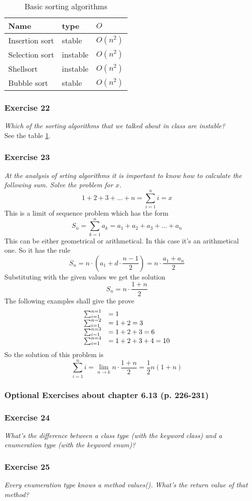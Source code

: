 \begin{table}[h!]
	\centering
	\begin{tabular}{l l l}
		Name		& type		& $O$ \\
		\hline
		Insertion sort	& stable	& $O(n^2)$ \\
		Selection sort	& instable	& $O(n^2)$ \\
		Shellsort	& instable	& $O(n^2)$ \\
		Bubble sort	& stable	& $O(n^2)$ 
	\end{tabular}
	\caption{Basic sorting algorithms}
	\label{table:sorting-algorithms}
\end{table}

\subsubsection*{Exercise 22}
\textit{Which of the sorting algorithms that we talked about in class 
are instable?} \\
See the table \ref{table:sorting-algorithms}.

\subsubsection*{Exercise 23}
\textit{At the analysis of srting algorithms it is important to know how to
calculate the following sum. Solve the problem for $x$.} \\
\[ 1 + 2 + 3 + \dots + n =  \sum_{i=1}^{n} i = x \]
This is a limit of sequence problem which has the form
\[ S_n = \sum_{k=1}^n a_k = a_1 + a_2 + a_3 + \dots + a_n \]
This can be either geometrical or arithmetical. In this case it's an 
arithmetical one. So it has the rule 
\[ S_n = n \cdot \left( a_1 + d \cdot \frac{n-1}{2}\right) = n \cdot \frac{a_1+a_n}{2} \]
Substituting with the given values we get the solution 
\[ S_n = n \cdot \frac{1+n}{2} \]
The following examples shall give the prove
\[ \begin{array}{l l l}
	\sum_{i=1}^{n=1} &= 1 \\
	\sum_{i=1}^{n=2} &= 1 + 2 = 3 \\
	\sum_{i=1}^{n=3} &= 1 + 2 + 3 = 6 \\
	\sum_{i=1}^{n=4} &= 1 + 2 + 3 + 4 = 10 \\
\end{array} \]
So the solution of this problem is 
\[ \sum_{i=1}^{n} i = \lim_{n \rightarrow k} n \cdot \frac{1+n}{2} = \frac{1}{2}  n (1+n) \]

\subsubsection{Optional Exercises about chapter 6.13 (p. 226-231)}

\subsubsection*{Exercise 24}
\textit{What's the difference between a class type (with the keyword class)
and a enumeration type (with the keyword enum)?} \\

\subsubsection*{Exercise 25}
\textit{Every enumeration type knows a method values(). What's the return
value of that method?} \\

